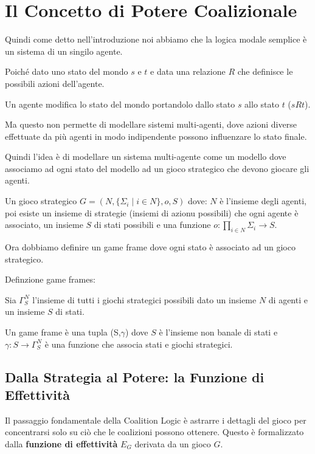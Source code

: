\documentclass[12pt]{article}
\begin{document}
\section{Il Concetto di Potere Coalizionale}

Quindi come detto nell'introduzione noi abbiamo che la logica modale semplice è un sistema di un singilo agente.

Poiché dato uno stato del mondo $s$ e $t$ e data una relazione $R$ che definisce le possibili azioni dell'agente.

Un agente modifica lo stato del mondo portandolo dallo stato $s$ allo stato $t$ ($s R t$).

Ma questo non permette di modellare sistemi multi-agenti, dove azioni diverse effettuate da più agenti in modo indipendente possono influenzare lo stato finale.

Quindi l'idea è di modellare un sistema multi-agente come un modello dove associamo ad ogni stato del modello ad un gioco strategico che devono giocare gli agenti.

Un gioco strategico $G = (N, \{\Sigma_i \mid i \in N\},o,S)$ dove: $N$ è l'insieme degli agenti, poi esiste un insieme di strategie (insiemi di azionu possibili) che ogni agente
è associato, un insieme $S$ di stati possibili e una funzione $o : \prod_{i \in N} \Sigma_i \rightarrow S$.

Ora dobbiamo definire un game frame dove ogni stato è associato ad un gioco strategico.

Definzione game frames:

Sia $\Gamma^N_S$ l'insieme di tutti i giochi strategici possibili dato un insieme $N$ di agenti e un insieme $S$ di stati.

Un game frame è una tupla (S,$\gamma$) dove $S$ è l'insieme non banale di stati e $\gamma : S \rightarrow \Gamma^N_S$
è una funzione che associa stati e giochi strategici.

\subsection{Dalla Strategia al Potere: la Funzione di Effettività}

Il passaggio fondamentale della Coalition Logic è astrarre i dettagli del gioco
per concentrarsi solo su ciò che le coalizioni possono ottenere. Questo è
formalizzato dalla \textbf{funzione di effettività} $E_G$ derivata da un gioco $G$.
\end{document}
